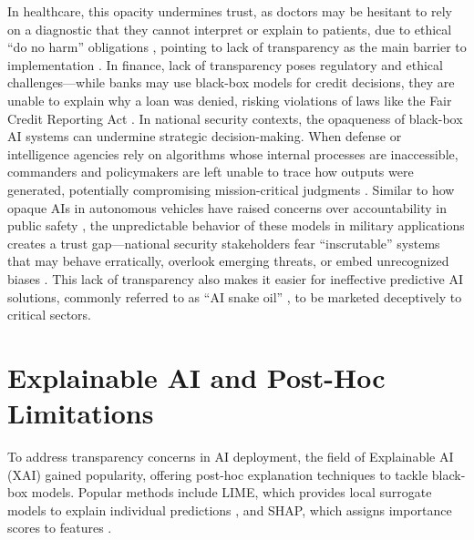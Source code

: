 In healthcare, this opacity undermines trust, as doctors may be hesitant to rely on a diagnostic that they cannot interpret or explain to patients, due to ethical ``do no harm'' obligations \cite{transparency_ai_in_healthcare}, pointing to lack of transparency as the main barrier to implementation \cite{Markus_2021}. In finance, lack of transparency poses regulatory and ethical challenges---while banks may use black-box models for credit decisions, they are unable to explain why a loan was denied, risking violations of laws like the Fair Credit Reporting Act \cite{maple2023airevolutionopportunitieschallenges}. In national security contexts, the opaqueness of black-box AI systems can undermine strategic decision-making. When defense or intelligence agencies rely on algorithms whose internal processes are inaccessible, commanders and policymakers are left unable to trace how outputs were generated, potentially compromising mission-critical judgments \cite{yu2022implications}. Similar to how opaque AIs in autonomous vehicles have raised concerns over accountability in public safety \cite{li2023knowledgedrivenautonomousdriving}, the unpredictable behavior of these models in military applications creates a trust gap—national security stakeholders fear ``inscrutable'' systems that may behave erratically, overlook emerging threats, or embed unrecognized biases \cite{HollandMichel2020TheBB, Hagos2024NeuroSymbolicAF}. This lack of transparency also makes it easier for ineffective predictive AI solutions, commonly referred to as ``AI snake oil'' \cite{snakeoil}, to be marketed deceptively to critical sectors.




\section{Explainable AI and Post-Hoc Limitations}
\label{sec:sec_xai}

To address transparency concerns in AI deployment, the field of Explainable AI (XAI) gained popularity, offering post-hoc explanation techniques to tackle black-box models. Popular methods include LIME, which provides local surrogate models to explain individual predictions \cite{ribeiro2016whyitrustyou}, and SHAP, which assigns importance scores to features \cite{lundberg2017unifiedapproachinterpretingmodel}. 

